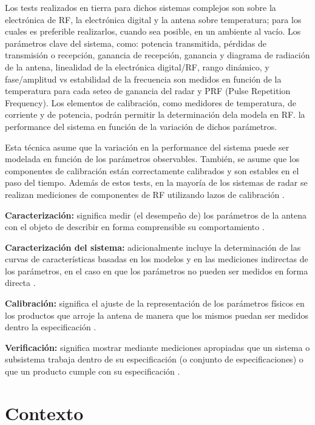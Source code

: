 Los tests realizados en tierra para dichos sistemas complejos son sobre la electrónica de RF, la electrónica digital y la 
antena sobre temperatura; para los cuales es preferible realizarlos, cuando sea posible, en un ambiente al vacío. Los 
parámetros clave del sistema, como: potencia transmitida, pérdidas de transmisión o recepción, ganancia de recepción, 
ganancia y diagrama de radiación de la antena, linealidad de la electrónica digital/RF, rango dinámico, y fase/amplitud vs 
estabilidad de la frecuencia son medidos en función de la temperatura para cada seteo de ganancia del radar y PRF (Pulse 
Repetition Frequency). Los elementos de calibración, como medidores de temperatura, de corriente y de potencia, podrán 
permitir la determinación dela modela en RF. la performance del sistema en función de la variación de dichos parámetros.
    
Esta técnica asume que la variación en la performance del sistema puede ser modelada en función de los parámetros observables. 
También, se asume que los componentes de calibración están correctamente calibrados y son estables en el paso del tiempo. 
Además de estos tests, en la mayoría de los sistemas de radar se realizan mediciones de componentes de RF utilizando lazos de 
calibración \cite{Curlander1991}.

{\textbf{Caracterización:}} significa medir (el desempeño de) los parámetros de la antena con el objeto de describir en 
forma comprensible su comportamiento \cite{Mittermayer2007}.

{\textbf{Caracterización del sistema:}} adicionalmente incluye la determinación de las curvas de características basadas 
en los modelos y en las mediciones indirectas de los parámetros, en el caso en que los parámetros no pueden ser medidos 
en forma directa \cite{Mittermayer2007}.

{\textbf{Calibración:}} significa el ajuste de la representación de los parámetros físicos en los productos que arroje la 
antena de manera que los mismos puedan ser medidos dentro la especificación \cite{Mittermayer2007}.

{\textbf{Verificación:}} significa mostrar mediante mediciones apropiadas que un sistema o subsistema trabaja dentro de su 
especificación (o conjunto de especificaciones) o que un producto cumple con su especificación \cite{Mittermayer2007}.

\section{Contexto}

